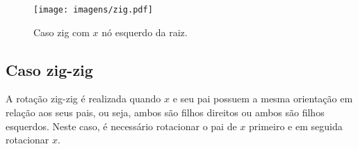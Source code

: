 {\begin{figure}[h]
\begin{comment}
        \begin{scope}[xshift=6cm, local bounding box=scope2]
        \Tree [.$x$ \node[alpha]{a}; [.$y$ \node[alpha]{b}; \node[alpha]{c}; ] ]
        \end{scope}
        
        \draw[->] ([yshift=-0.5*\ht\strutbox,xshift=0.5cm]scope1.east) -- node [n] {} ([yshift=-0.5*\ht\strutbox,xshift=-0.5cm]scope2.west); %
        
        \draw[->] ([yshift=-1.65cm, xshift=-0.285cm]scope1.north) arc (180:0:0.7cm);
        
    \end{tikzpicture}
    \end{comment}
    \texttt{[image: imagens/zig.pdf]}
    \label{fig:zig}

\caption{Caso zig com $x$ nó esquerdo da raiz.}
\end{figure}

\subsection{Caso zig-zig}

A rotação zig-zig é realizada quando $x$ e seu pai possuem a mesma orientação em relação aos seus pais, ou seja, ambos são filhos direitos ou ambos são filhos esquerdos. Neste caso, é necessário rotacionar o pai de $x$ primeiro e em seguida rotacionar $x$.

\begin{figure}[H]
    \centering
    \begin{comment}
    \begin{tikzpicture}[
        ed/.style = {densely dashed, shorten >= 5pt},
        alpha/.style = {regular polygon, regular polygon sides=3, draw, minimum size=1.1cm, inner sep=2pt, anchor=south},
        level distance=1.5cm,
        sibling distance=0.25cm
        ]
        
        \begin{scope}[local bounding box=scope1]
        \Tree [.$z$  [.$y$ [.$x$ \node[alpha]{a}; \node[alpha]{b}; ] \node[alpha]{c};] \node[alpha]{d};]
        \end{scope}
        
        \begin{scope}[xshift=6cm, local bounding box=scope2]
        \Tree [.$x$ \node[alpha]{a}; [.$y$ \node[alpha]{b}; [.$z$ \node[alpha]{c}; \node[alpha]{d}; ]]]
        \end{scope}
        

\end{comment}
\end{figure}}
